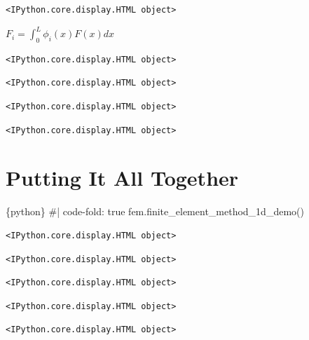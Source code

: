 \documentclass[
  11pt,
  a4paper,
]{scrbook}
\newenvironment{Shaded}{\begin{snugshade}}{\end{snugshade}}
\newcommand{\InformationTok}[1]{\textcolor[rgb]{0.37,0.37,0.37}{#1}}
\begin{document}
\begin{verbatim}
<IPython.core.display.HTML object>
\end{verbatim}

$\displaystyle F_i = \int_0^L \phi_i(x) F(x) dx$

\begin{verbatim}
<IPython.core.display.HTML object>
\end{verbatim}

\begin{verbatim}
<IPython.core.display.HTML object>
\end{verbatim}

\begin{verbatim}
<IPython.core.display.HTML object>
\end{verbatim}

\begin{verbatim}
<IPython.core.display.HTML object>
\end{verbatim}

\section{Putting It All Together}\label{putting-it-all-together}

\begin{Shaded}
\begin{Highlighting}[]
\InformationTok{\textasciigrave{}\textasciigrave{}\textasciigrave{}\{python\}}
\InformationTok{\#| code{-}fold: true}
\InformationTok{fem.finite\_element\_method\_1d\_demo()}
\InformationTok{\textasciigrave{}\textasciigrave{}\textasciigrave{}}
\end{Highlighting}
\end{Shaded}

\begin{verbatim}
<IPython.core.display.HTML object>
\end{verbatim}

\begin{verbatim}
<IPython.core.display.HTML object>
\end{verbatim}

\begin{verbatim}
<IPython.core.display.HTML object>
\end{verbatim}

\begin{verbatim}
<IPython.core.display.HTML object>
\end{verbatim}

\begin{verbatim}
<IPython.core.display.HTML object>
\end{verbatim}
\end{document}
